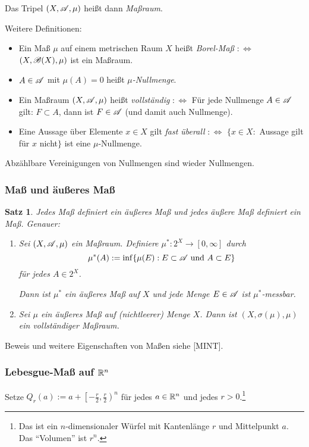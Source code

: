 \documentclass[
 a4paper,
 12pt,
 parskip=half
 ]{scrartcl}
\theoremstyle{plain}
\newtheorem*{thm*}{Satz}
\theoremstyle{definition}
\numberwithin{equation}{section}
\begin{document}
Das Tripel $(X, \mathscr{A}, \mu)$ heißt dann \emph{Maßraum}.

Weitere Definitionen:
\begin{itemize}
 \item Ein Maß $\mu$ auf einem metrischen Raum $X$ heißt \emph{Borel-Maß} $:\Leftrightarrow$ $(X, \mathscr{B}(X), \mu)$ ist ein Maßraum.
 \item $A \in \mathscr{A}$ mit $\mu(A) = 0$ heißt \emph{$\mu$-Nullmenge}.
 \item Ein Maßraum $(X, \mathscr{A}, \mu)$ heißt \emph{vollständig} $:\Leftrightarrow$ Für jede Nullmenge $A \in \mathscr{A}$ gilt: $F \subset A$, dann ist $F \in \mathscr{A}$ (und damit auch Nullmenge).
 \item Eine Aussage über Elemente $x \in X$ gilt \emph{fast überall} $:\Leftrightarrow$
 $\{ x \in X :$  Aussage gilt für  $x$ nicht$\}$
 ist eine $\mu$-Nullmenge.
\end{itemize}

\begin{bem}
 Abzählbare Vereinigungen von Nullmengen sind wieder Nullmengen.
\end{bem}

\subsubsection{Maß und äußeres Maß}
\begin{thm*}
 Jedes Maß definiert ein äußeres Maß und jedes äußere Maß definiert ein Maß. Genauer:
 \begin{enumerate}
  \item Sei $(X,\mathscr{A},\mu)$ ein Maßraum. Definiere $\mu^\ast:2^X \to [0,\infty]$ durch
  \[ \mu^\ast(A) := \inf \{ \mu(E) : E \subset \mathscr{A} \text{ und } A \subset E \} \]
  für jedes $A \in 2^X$.
  
  Dann ist $\mu^\ast$ ein äußeres Maß auf $X$ und jede Menge $E \in \mathscr{A}$ ist $\mu^\ast$-messbar.
  \item Sei $\mu$ ein äußeres Maß auf (nichtleerer) Menge $X$. Dann ist $(X, \sigma(\mu), \mu)$ ein voll\-ständiger Maßraum.
 \end{enumerate}
\end{thm*}

Beweis und weitere Eigenschaften von Maßen siehe [MINT].

\subsubsection{Lebesgue-Maß auf \texorpdfstring{$\mathbb{R}^n$}{Rn}}
Setze $Q_r(a) := a + \left[ - \frac{r}{2}, \frac{r}{2} \right)^n$ für jedes $a \in \mathbb{R}^n$ und jedes $r > 0$.\footnote{Das ist ein $n$-dimensionaler Würfel mit Kantenlänge $r$ und Mittelpunkt $a$. Das ``Volumen'' ist $r^n$.}
\end{document}

